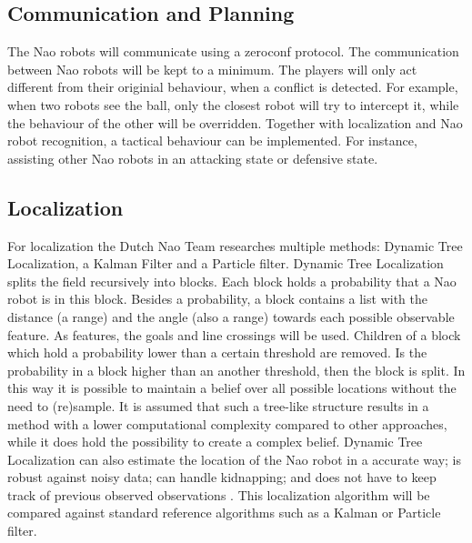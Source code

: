 \documentclass[11pt]{llncs}
\begin{document}
\subsection{Communication and Planning}
The Nao robots will communicate using a zeroconf protocol. The  communication between Nao robots will be kept to a minimum. The players will only act different from their originial behaviour, when a conflict is detected. For example, when two robots see the ball, only the closest robot will try to intercept it, while the behaviour of the other will be overridden. Together with localization and Nao robot recognition, a tactical behaviour can be implemented. For instance, assisting other Nao robots in an attacking state or defensive state.
\subsection{Localization}
For localization the Dutch Nao Team researches multiple methods: Dynamic Tree Localization, a Kalman Filter and a Particle filter. 
Dynamic Tree Localization \cite{vdMolen2011} splits the field recursively into blocks. Each block holds a probability that a Nao robot is in this block. 
Besides a probability, a block contains a list with the distance (a range) and the angle (also a range) towards each possible observable feature. 
As features, the goals and line crossings will be used. Children of a block which hold a probability lower than a certain threshold are removed.
Is the probability in a block higher than an another threshold, then the block is split. In this way it is possible to maintain a belief over all possible locations without the need to (re)sample.
It is assumed that such a tree-like structure results in a method with a lower computational complexity compared to other approaches, while it does hold the possibility to create a complex belief. 
Dynamic Tree Localization can also estimate the location of the Nao robot in a accurate way; is robust against noisy data; can handle kidnapping; and does not have to keep track of previous observed observations \cite{vdMolen2011}.
This localization algorithm will be compared against standard reference algorithms such as a Kalman or Particle filter. 
\end{document}
